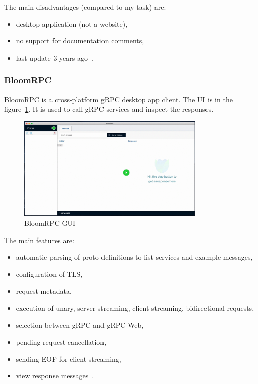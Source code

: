 The main disadvantages (compared to my task) are:
\begin{itemize}
    \item desktop application (not a website),
    \item no support for documentation comments,
    \item last update 3 years ago~\cite{grpc-wombat}.
\end{itemize}


\subsubsection{BloomRPC}
BloomRPC is a cross-platform gRPC desktop app client.
The UI is in the figure~\ref{fig:grpc-bloomrpc}.
It is used to call gRPC services and inspect the responses.
\cite{grpc-bloomrpc}

\begin{figure}[hbt!]
    \centering
    \captionsetup{justification=centering}
    \includegraphics[width=0.8\textwidth]{images/grpc/bloomrpc}
    \caption{BloomRPC GUI~\cite{grpc-bloomrpc}}
    \label{fig:grpc-bloomrpc}
\end{figure}

The main features are:
\begin{itemize}
    \item automatic parsing of proto definitions to list services and example messages,
    \item configuration of TLS,
    \item request metadata,
    \item execution of unary, server streaming, client streaming, bidirectional requests,
    \item selection between gRPC and gRPC-Web,
    \item pending request cancellation,
    \item sending EOF for client streaming,
    \item view response messages~\cite{grpc-bloomrpc}.
\end{itemize}

